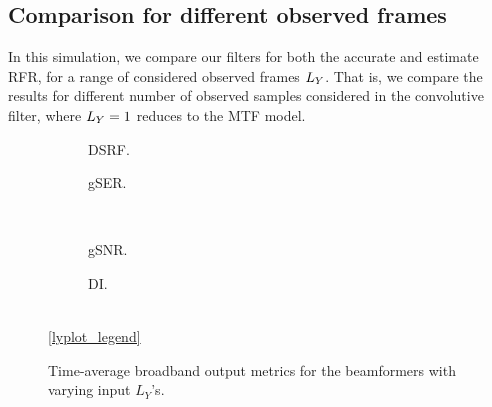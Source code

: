 %		
%

\subsection{Comparison for different observed frames}

In this simulation, we compare our filters for both the accurate and estimate RFR, for a range of considered observed frames $\Ly$. That is, we compare the results for different number of observed samples considered in the convolutive filter, where $\Ly = 1$ reduces to the MTF model.

\begin{figure}[!ht]
	\centering
	\begin{subfigure}{0.49\textwidth}
		\centering
		
		\caption{DSRF.}
		\label{subfig:lineplot__DSRF__iSER_n15__Ly_var}
	\end{subfigure}\hfill
	\begin{subfigure}{0.49\textwidth}
		\centering
		
		\caption{gSER.}
		\label{subfig:lineplot__gSER__iSER_n15__Ly_var}
	\end{subfigure}\\[1em]
	\begin{subfigure}{0.49\textwidth}
		\centering
		
		\caption{gSNR.}
		\label{subfig:lineplot__gSNR__iSER_n15__Ly_var}
	\end{subfigure}\hfill
	\begin{subfigure}{0.49\textwidth}
		\centering
		
		\caption{DI.}
		\label{subfig:lineplot__DI__iSER_n15__Ly_var}
	\end{subfigure}\\[1em]
	\ref*{lyplot_legend}
	\caption{Time-average broadband output metrics for the beamformers with varying input $L_Y$'s.}
	\label{fig:lineplot__iSER_n15__Ly_var}
\end{figure}

